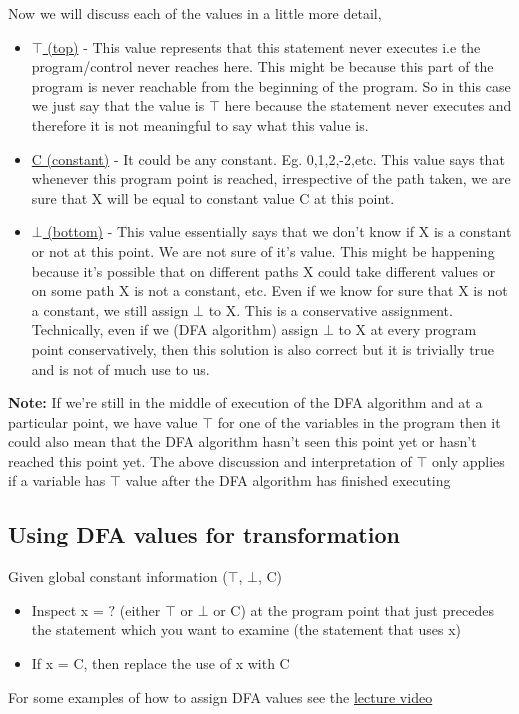 Now we will discuss each of the values in a little more detail,
\begin{itemize}
    \item \underline{$\top$ (top)} - This value represents that this statement never executes i.e the program/control never reaches here. This might be because this part of the program is never reachable from the beginning of the program. So in this case we just say that the value is $\top$ here because the statement never executes and therefore it is not meaningful to say what this value is.
    \item \underline{C (constant)} - It could be any constant. Eg. 0,1,2,-2,etc. This value says that whenever this program point is reached, irrespective of the path taken, we are sure that X will be equal to constant value C at this point.
    \item \underline{$\bot$ (bottom)} - This value essentially says that we don't know if X is a constant or not at this point. We are not sure of it's value. This might be happening because it's possible that on different paths X could take different values or on some path X is not a constant, etc. Even if we know for sure that X is not a constant, we still assign $\bot$ to X. This is a conservative assignment. Technically, even if we (DFA algorithm) assign $\bot$ to X at every program point conservatively, then this solution is also correct but it is trivially true and is not of much use to us.
\end{itemize}

\textbf{Note:} If we're still in the middle of execution of the DFA algorithm and at a particular point, we have value $\top$ for one of the variables in the program then it could also mean that the DFA algorithm hasn't seen this point yet or hasn't reached this point yet. The above discussion and interpretation of $\top$ only applies if a variable has $\top$ value after the DFA algorithm has finished executing

\subsection{Using DFA values for transformation}

Given global constant information ($\top$, $\bot$, C)
\begin{itemize}
    \item Inspect x = $?$ (either $\top$ or $\bot$ or C) at the program point that just precedes the statement which you want to examine (the statement that uses x)
    \item If x = C, then replace the use of x with C
\end{itemize}

For some examples of how to assign DFA values see the 
\href{https://www.youtube.com/watch?v=EI56VONzCcc&list=PLf3ZkSCyj1tf3rPAkOKY5hUzDrDoekAc7&index=75&ab_channel=compilerai}{lecture video}
